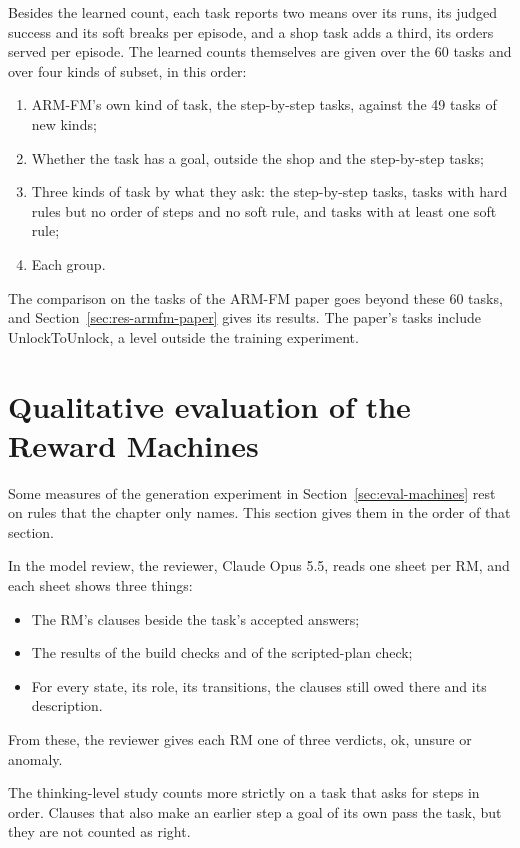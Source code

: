 \documentclass[11pt,english,listoffigures,listoftables]{tfgetsinf}
\begin{document}
Besides the learned count, each task reports two means over its runs, its judged success and its soft breaks per episode, and a shop task adds a third, its orders served per episode. The learned counts themselves are given over the 60 tasks and over four kinds of subset, in this order:
\begin{enumerate}
    \item ARM-FM's own kind of task, the step-by-step tasks, against the 49 tasks of new kinds;
    \item Whether the task has a goal, outside the shop and the step-by-step tasks;
    \item Three kinds of task by what they ask: the step-by-step tasks, tasks with hard rules but no order of steps and no soft rule, and tasks with at least one soft rule;
    \item Each group.
\end{enumerate}

The comparison on the tasks of the ARM-FM paper goes beyond these 60 tasks, and Section~\ref{sec:res-armfm-paper} gives its results. The paper's tasks include UnlockToUnlock, a level outside the training experiment.

\section{Qualitative evaluation of the Reward Machines}
\label{app:eval-machines}
Some measures of the generation experiment in Section~\ref{sec:eval-machines} rest on rules that the chapter only names. This section gives them in the order of that section.

In the model review, the reviewer, Claude Opus 5.5, reads one sheet per RM, and each sheet shows three things:
\begin{itemize}
    \item The RM's clauses beside the task's accepted answers;
    \item The results of the build checks and of the scripted-plan check;
    \item For every state, its role, its transitions, the clauses still owed there and its description.
\end{itemize}
\noindent From these, the reviewer gives each RM one of three verdicts, ok, unsure or anomaly.

The thinking-level study counts more strictly on a task that asks for steps in order. Clauses that also make an earlier step a goal of its own pass the task, but they are not counted as right.
\end{document}
